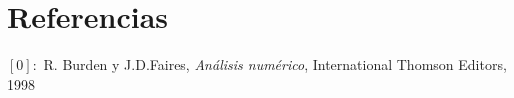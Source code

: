 \section{Referencias}

$[0]:$  R. Burden y J.D.Faires, \textit{Análisis numérico}, International Thomson Editors, 1998 \\

